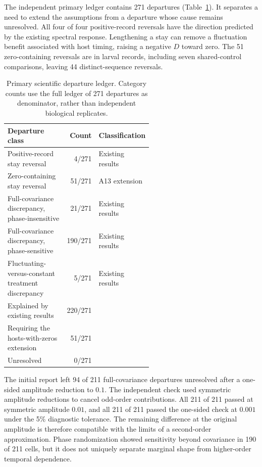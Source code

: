The independent primary ledger contains 271 departures
(Table~\ref{num-departures}). It separates a need to extend the assumptions
from a departure whose cause remains unresolved. All four of four
positive-record reversals have the direction predicted by the existing
spectral response. Lengthening a stay can remove a fluctuation benefit
associated with host timing, raising a negative $D$ toward zero.
The 51 zero-containing reversals are in larval records, including seven
shared-control comparisons, leaving 44 distinct-sequence reversals.

\begin{table}[htbp]
\centering
\caption{Primary scientific departure ledger. Category counts use the full
ledger of 271 departures as denominator, rather than independent biological replicates.}
\label{num-departures}
\begin{tabular}{p{0.57\linewidth}rl}
\toprule
Departure class & Count & Classification \\
\midrule
Positive-record stay reversal & 4/271 & Existing results \\
Zero-containing stay reversal & 51/271 & A13 extension \\
Full-covariance discrepancy, phase-insensitive & 21/271 & Existing results \\
Full-covariance discrepancy, phase-sensitive & 190/271 & Existing results \\
Fluctuating-versus-constant treatment discrepancy & 5/271 & Existing results \\
\midrule
Explained by existing results & 220/271 & \\
Requiring the hosts-with-zeros extension & 51/271 & \\
Unresolved & 0/271 & \\
\bottomrule
\end{tabular}
\end{table}

The initial report left 94 of 211 full-covariance departures unresolved
after a one-sided amplitude reduction to $0.1$. The independent check
used symmetric amplitude reductions to cancel odd-order contributions.
All 211 of 211 passed at symmetric amplitude $0.01$, and all 211 of 211
passed the one-sided check at $0.001$ under the 5\% diagnostic tolerance.
The remaining difference at the original amplitude is therefore compatible
with the limits of a second-order approximation. Phase randomization
showed sensitivity beyond covariance in 190 of 211 cells, but it does not
uniquely separate marginal shape from higher-order temporal dependence.

